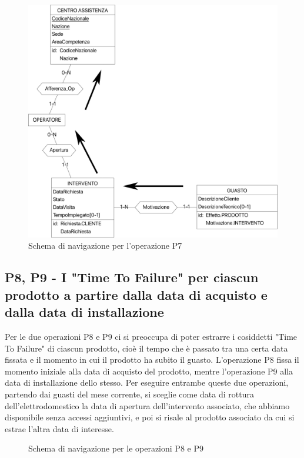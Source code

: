 \documentclass[a4paper, 12pt]{report}
\begin{document}
\begin{figure}[H]
	\centering
	\includegraphics[width=\linewidth]{images/P7.png}
	\caption{Schema di navigazione per l'operazione P7}
\end{figure}

\subsection{P8, P9 - I "Time To Failure" per ciascun prodotto a partire dalla data di acquisto e dalla data di installazione}

Per le due operazioni P8 e P9 ci si preoccupa di poter estrarre i cosiddetti "Time To Failure" di ciascun prodotto, cioè il
tempo che è passato tra una certa data fissata e il momento in cui il prodotto ha subito il guasto. L'operazione P8 fissa il momento iniziale alla data di acquisto
del prodotto, mentre l'operazione P9 alla data di installazione dello stesso. Per eseguire entrambe queste due operazioni, partendo dai guasti del mese corrente, si
sceglie come data di rottura dell'elettrodomestico la data di apertura dell'intervento associato, che abbiamo disponibile senza accessi aggiuntivi, e poi si risale
al prodotto associato da cui si estrae l'altra data di interesse.

\begin{figure}[H]
	\centering
	\caption{Schema di navigazione per le operazioni P8 e P9}
\end{figure}
\end{document}
